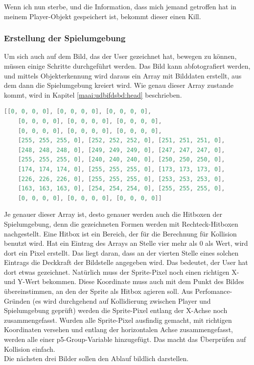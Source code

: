 Wenn ich nun sterbe, und die Information, dass mich jemand getroffen hat in meinem Player-Objekt gespeichert ist, bekommt dieser einen Kill.



\subsubsection{Erstellung der Spielumgebung} \label{impl:Spielumgebung}
Um sich auch auf dem Bild, das der User gezeichnet hat, bewegen zu können, müssen einige Schritte durchgeführt werden. Das Bild kann abfotografiert werden, und mittels Objekterkennung wird daraus ein Array mit Bilddaten erstellt, 
aus dem dann die Spielumgebung kreiert wird. Wie genau dieser Array zustande kommt, wird in Kapitel \ref{maai:udbifdsbd:head} beschrieben.
\\
\begin{lstlisting}[caption=Vereinfachte Darstellung eines Bilddaten-Arrays,language=Java,label=lst:impl:bilddaten]
    [[0, 0, 0, 0], [0, 0, 0, 0], [0, 0, 0, 0],
    [0, 0, 0, 0], [0, 0, 0, 0], [0, 0, 0, 0],
    [0, 0, 0, 0], [0, 0, 0, 0], [0, 0, 0, 0],
    [255, 255, 255, 0], [252, 252, 252, 0], [251, 251, 251, 0],
    [248, 248, 248, 0], [249, 249, 249, 0], [247, 247, 247, 0],
    [255, 255, 255, 0], [240, 240, 240, 0], [250, 250, 250, 0],
    [174, 174, 174, 0], [255, 255, 255, 0], [173, 173, 173, 0],
    [226, 226, 226, 0], [255, 255, 255, 0], [253, 253, 253, 0],
    [163, 163, 163, 0], [254, 254, 254, 0], [255, 255, 255, 0],
    [0, 0, 0, 0], [0, 0, 0, 0], [0, 0, 0, 0]]
\end{lstlisting}


Je genauer dieser Array ist, desto genauer werden auch die Hitboxen der Spielumgebung, denn die gezeichneten Formen werden mit Rechteck-Hitboxen nachgestellt.
Eine Hitbox ist ein Bereich, der für die Berechnung für Kollision benutzt wird.
Hat ein Eintrag des Arrays an Stelle vier mehr als 0 als Wert, wird dort ein Pixel erstellt. Das liegt daran, dass an der vierten Stelle eines solchen Eintrags die Deckkraft der Bildstelle angegeben wird. Das bedeutet, der User hat dort etwas gezeichnet.
Natürlich muss der Sprite-Pixel noch einen richtigen X- und Y-Wert bekommen. Diese Koordinate muss auch mit dem Punkt des Bildes übereinstimmen, an den der Sprite als Hitbox agieren soll.
Aus Perfomance-Gründen (es wird durchgehend auf Kollidierung zwischen Player und Spielumgebung geprüft) werden die Sprite-Pixel entlang der X-Achse noch zusammengefasst.
Wurden alle Sprite-Pixel ausfindig gemacht, mit richtigen Koordinaten versehen und entlang der horizontalen Achse zusammengefasst, werden alle einer p5-Group-Variable hinzugefügt.
Das macht das Überprüfen auf Kollision einfach. \\
Die nächsten drei Bilder sollen den Ablauf bildlich darstellen.

